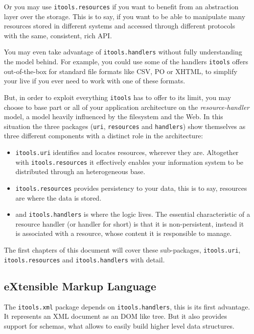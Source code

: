 Or you may use {\tt itools.resources} if you want to benefit from an
abstraction layer over the storage. This is to say, if you want to be able
to manipulate many resources stored in different systems and accessed
through different protocols with the same, consistent, rich API.

You may even take advantage of {\tt itools.handlers} without fully
understanding the model behind. For example, you could use some of the
handlers {\tt itools} offers out-of-the-box for standard file formats
like CSV, PO or XHTML, to simplify your live if you ever need to work
with one of these formats.

But, in order to exploit everything {\tt itools} has to offer to its limit,
you may choose to base part or all of your application architecture on the
{\em resource-handler} model, a model heavily influenced by the filesystem
and the Web. In this situation the three packages ({\tt uri}, {\tt resources}
and {\tt handlers}) show themselves as three different components with
a distinct role in the architecture:

\begin{itemize}
  \item {\tt itools.uri} identifies and locates resources, wherever they
    are. Altogether with {\tt itools.resources} it effectively enables your
    information system to be distributed through an heterogeneous base.

  \item {\tt itools.resources} provides persistency to your data, this is
    to say, resources are where the data is stored.

  \item and {\tt itools.handlers} is where the logic lives. The essential
    characteristic of a resource handler (or handler for short) is that it is
    non-persistent, instead it is associated with a resource, whose content
    it is responsible to manage.
\end{itemize}

The first chapters of this document will cover these sub-packages,
{\tt itools.uri}, {\tt itools.resources} and {\tt itools.handlers} with
detail.

\subsection{eXtensible Markup Language}

The {\tt itools.xml} package depends on {\tt itools.handlers}, this is its
first advantage. It represents an XML document as an DOM like tree. But it
also provides support for schemas, what allows to easily build higher
level data structures.

